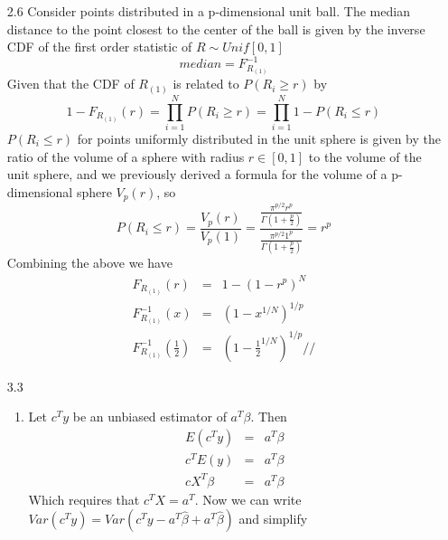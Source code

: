 \documentclass{article}
\begin{document}
\renewcommand{\vec}[1]{\mathbf{#1}}
\newcommand{\ovec}[1]{\mathbf{\Omega_{#1}}}
\newcommand{\normfront}[1]{(#1\pi)^{-\frac{1}{2}}}






\begin{enumerate}
  \item[2.6] Consider points distributed in a p-dimensional unit ball. The median distance to the point closest to the center of the ball is given by the inverse CDF of the first order statistic of $R \sim Unif[0,1]$
  $$ median = F_{R_{(1)}}^{-1} $$
  Given that the CDF of $R_{(1)}$ is related to $P(R_i \ge r)$ by
  $$ 1 - F_{R_{(1)}}(r) = \prod_{i=1}^N P(R_i \ge r) = \prod_{i=1}^N 1-P(R_i \le r) $$
  $P(R_i \le r)$ for points uniformly distributed in the unit sphere is given by the ratio of the volume of a sphere with radius $r \in [0,1]$ to the volume of the unit sphere, and we previously derived a formula for the volume of a p-dimensional sphere $V_p(r)$, so
  $$ P(R_i \le r) = \frac{V_p(r)}{V_p(1)} = \frac{\frac{\pi^{p/2}r^p}{\Gamma(1 + \frac{p}{2})}}{\frac{\pi^{p/2}1^p}{\Gamma(1 + \frac{p}{2})}} = r^p$$
  Combining the above we have
  \begin{eqnarray*}
    F_{R_{(1)}}(r) &=& 1- (1-r^p)^N \\
    F_{R_{(1)}}^{-1}(x) &=& (1-x^{1/N})^{1/p} \\
    F_{R_{(1)}}^{-1}\left(\frac{1}{2}\right) &=& \left(1-\frac{1}{2}^{1/N}\right)^{1/p} //
  \end{eqnarray*}
  \item[3.3]
    \begin{enumerate}
      \item Let $c^Ty$ be an unbiased estimator of $a^T\beta$. Then
      \begin{eqnarray*}
        E(c^Ty) &=& a^T\beta \\
        c^TE(y) &=& a^T\beta \\
        cX^T\beta &=& a^T\beta
      \end{eqnarray*}
      Which requires that $c^TX = a^T$. Now we can write $Var(c^Ty) = Var(c^Ty - a^T\hat\beta + a^T\hat\beta)$ and simplify
      \begin{eqnarray*}

\end{eqnarray*}
\end{enumerate}
\end{enumerate}
\end{document}
